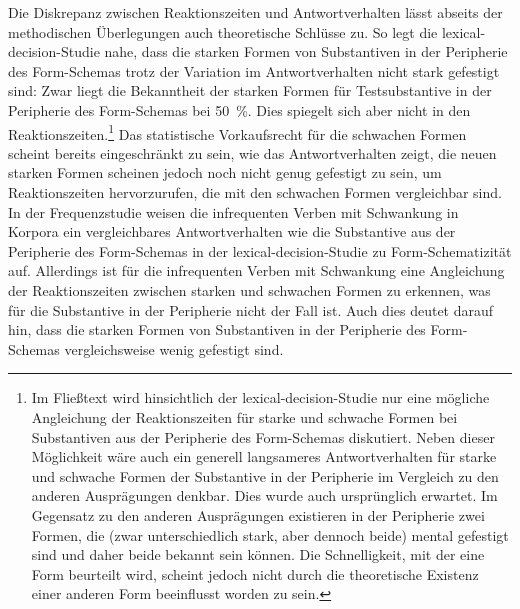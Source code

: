 Die Diskrepanz zwischen Reaktionszeiten und Antwortverhalten lässt abseits der methodischen Überlegungen auch theoretische Schlüsse zu. So legt die lex\-i\-cal-de\-ci\-sion-Stu\-die nahe, dass die starken Formen von Substantiven in der Peripherie des Form-Schemas trotz der Variation im Antwortverhalten nicht stark gefestigt sind: Zwar liegt die Bekanntheit der starken Formen für Testsubstantive in der Peripherie des Form-Schemas bei 50~\%. Dies spiegelt sich aber nicht in den Reaktionszeiten.\footnote{Im Fließtext wird hinsichtlich der lexical-decision-Studie nur eine mögliche Angleichung der Reaktionszeiten für starke und schwache Formen bei Substantiven aus der Peripherie des Form-Schemas diskutiert. Neben dieser Möglichkeit wäre auch ein generell langsameres Antwortverhalten für starke und schwache Formen der Substantive in der Peripherie im Vergleich zu den anderen Ausprägungen denkbar. Dies wurde auch ursprünglich erwartet. Im Gegensatz zu den anderen Ausprägungen existieren in der Peripherie zwei Formen, die (zwar unterschiedlich stark, aber dennoch beide) mental gefestigt sind und daher beide bekannt sein können. Die Schnelligkeit, mit der eine Form beurteilt wird, scheint jedoch nicht durch die theoretische Existenz einer anderen Form beeinflusst worden zu sein.} Das statistische Vorkaufsrecht für die schwachen Formen scheint bereits eingeschränkt zu sein, wie das Antwortverhalten zeigt, die neuen starken Formen scheinen jedoch noch nicht genug gefestigt zu sein, um  Reaktionszeiten hervorzurufen, die mit den schwachen Formen vergleichbar sind. In der Frequenzstudie weisen die infrequenten Verben mit Schwankung in Korpora ein vergleichbares Antwortverhalten wie die Substantive aus der Peripherie des Form-Schemas in der lexical-decision-Studie zu Form-Schematizität auf. Allerdings ist für die infrequenten Verben mit Schwankung eine Angleichung der Reaktionszeiten zwischen starken und schwachen Formen zu erkennen, was für die Substantive in der Peripherie nicht der Fall ist. Auch dies deutet darauf hin, dass die starken Formen von Substantiven in der Peripherie des Form-Schemas vergleichsweise wenig gefestigt sind. 



